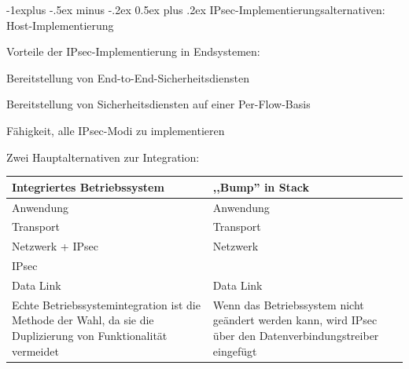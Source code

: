 \documentclass[a4paper]{article}
\makeatletter
\renewcommand{\subsection}{\@startsection{subsection}{2}{0mm}%
 {-1explus -.5ex minus -.2ex}%
 {0.5ex plus .2ex}%
 {\normalfont\normalsize\bfseries}}
\makeatother
\begin{document}
\begin{multicols}{3}
      \subsection{IPsec-Implementierungsalternativen: Host-Implementierung}
      \begin{itemize*}
            \item Vorteile der IPsec-Implementierung in Endsystemen:
            \begin{itemize*}
                  \item Bereitstellung von End-to-End-Sicherheitsdiensten
                  \item Bereitstellung von Sicherheitsdiensten auf einer Per-Flow-Basis
                  \item Fähigkeit, alle IPsec-Modi zu implementieren
            \end{itemize*}
            \item Zwei Hauptalternativen zur Integration:
      \end{itemize*}
      \begin{tabular}{p{4cm}|p{4cm}}
            Integriertes Betriebssystem & ,,Bump'' in Stack                                                                                         \\\hline
            Anwendung                   & Anwendung                                                                                                 \\
            Transport                   & Transport                                                                                                 \\
            Netzwerk + IPsec            & Netzwerk                                                                                                  \\
            IPsec                       &                                                                                                           \\
            Data Link                   & Data Link                                                                                                 \\
            Echte Betriebssystemintegration ist die Methode der Wahl, da sie die Duplizierung von Funktionalität
            vermeidet                   & Wenn das Betriebssystem nicht geändert werden kann, wird IPsec über den Datenverbindungstreiber eingefügt
      \end{tabular}


\end{multicols}
\end{document}
